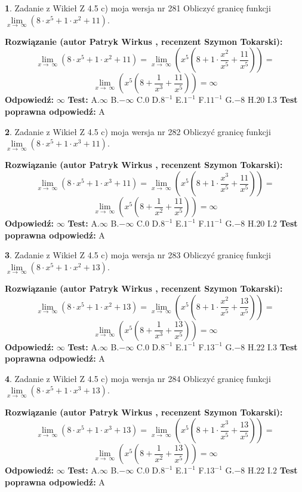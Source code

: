 \documentclass[12pt, a4paper]{article}
\theoremstyle{definition} %
\newtheorem{zad}{}
\newcommand{\zadStart}[1]{\begin{zad}#1\newline}
\newcommand{\zadStop}{\end{zad}}
\newcommand{\rozwStart}[2]{\noindent \textbf{Rozwiązanie (autor #1 , recenzent #2): }\newline}
\newcommand{\rozwStop}{\newline}
\newcommand{\odpStart}{\noindent \textbf{Odpowiedź:}\newline}
\newcommand{\odpStop}{\newline}
\newcommand{\testStart}{\noindent \textbf{Test:}\newline}
\newcommand{\testStop}{\newline}
\newcommand{\kluczStart}{\noindent \textbf{Test poprawna odpowiedź:}\newline}
\newcommand{\kluczStop}{\newline}
\begin{document}
\zadStart{Zadanie z Wikieł Z 4.5 c) moja wersja nr 281}
Obliczyć granicę funkcji  $\lim\limits_{x\to\ \infty}(8 \cdot x^{5}+1 \cdot x^{2}+11)$.
\zadStop
\rozwStart{Patryk Wirkus}{Szymon Tokarski}
$$\lim\limits_{x\to\ \infty}(8 \cdot x^{5}+1 \cdot x^{2}+11) = \lim\limits_{x\to\ \infty}(x^{5}(8 +1 \cdot \frac{x^{2}}{x^{5}}+\frac{11}{x^{5}})) =$$ $$\lim\limits_{x\to\ \infty}(x^{5}(8 +\frac{1}{x^{3}}+\frac{11}{x^{5}})) =\infty$$
\rozwStop
\odpStart
$\infty$
\odpStop
\testStart
A.$\infty$ B.$-\infty$ C.$0$ D.$8^{-1}$ E.$1^{-1}$
F.$11^{-1}$ G.$-8$
H.$20$
I.$3$
\testStop
\kluczStart
A
\kluczStop



\zadStart{Zadanie z Wikieł Z 4.5 c) moja wersja nr 282}
Obliczyć granicę funkcji  $\lim\limits_{x\to\ \infty}(8 \cdot x^{5}+1 \cdot x^{3}+11)$.
\zadStop
\rozwStart{Patryk Wirkus}{Szymon Tokarski}
$$\lim\limits_{x\to\ \infty}(8 \cdot x^{5}+1 \cdot x^{3}+11) = \lim\limits_{x\to\ \infty}(x^{5}(8 +1 \cdot \frac{x^{3}}{x^{5}}+\frac{11}{x^{5}})) =$$ $$\lim\limits_{x\to\ \infty}(x^{5}(8 +\frac{1}{x^{2}}+\frac{11}{x^{5}})) =\infty$$
\rozwStop
\odpStart
$\infty$
\odpStop
\testStart
A.$\infty$ B.$-\infty$ C.$0$ D.$8^{-1}$ E.$1^{-1}$
F.$11^{-1}$ G.$-8$
H.$20$
I.$2$
\testStop
\kluczStart
A
\kluczStop



\zadStart{Zadanie z Wikieł Z 4.5 c) moja wersja nr 283}
Obliczyć granicę funkcji  $\lim\limits_{x\to\ \infty}(8 \cdot x^{5}+1 \cdot x^{2}+13)$.
\zadStop
\rozwStart{Patryk Wirkus}{Szymon Tokarski}
$$\lim\limits_{x\to\ \infty}(8 \cdot x^{5}+1 \cdot x^{2}+13) = \lim\limits_{x\to\ \infty}(x^{5}(8 +1 \cdot \frac{x^{2}}{x^{5}}+\frac{13}{x^{5}})) =$$ $$\lim\limits_{x\to\ \infty}(x^{5}(8 +\frac{1}{x^{3}}+\frac{13}{x^{5}})) =\infty$$
\rozwStop
\odpStart
$\infty$
\odpStop
\testStart
A.$\infty$ B.$-\infty$ C.$0$ D.$8^{-1}$ E.$1^{-1}$
F.$13^{-1}$ G.$-8$
H.$22$
I.$3$
\testStop
\kluczStart
A
\kluczStop



\zadStart{Zadanie z Wikieł Z 4.5 c) moja wersja nr 284}
Obliczyć granicę funkcji  $\lim\limits_{x\to\ \infty}(8 \cdot x^{5}+1 \cdot x^{3}+13)$.
\zadStop
\rozwStart{Patryk Wirkus}{Szymon Tokarski}
$$\lim\limits_{x\to\ \infty}(8 \cdot x^{5}+1 \cdot x^{3}+13) = \lim\limits_{x\to\ \infty}(x^{5}(8 +1 \cdot \frac{x^{3}}{x^{5}}+\frac{13}{x^{5}})) =$$ $$\lim\limits_{x\to\ \infty}(x^{5}(8 +\frac{1}{x^{2}}+\frac{13}{x^{5}})) =\infty$$
\rozwStop
\odpStart
$\infty$
\odpStop
\testStart
A.$\infty$ B.$-\infty$ C.$0$ D.$8^{-1}$ E.$1^{-1}$
F.$13^{-1}$ G.$-8$
H.$22$
I.$2$
\testStop
\kluczStart
A
\kluczStop
\end{document}
